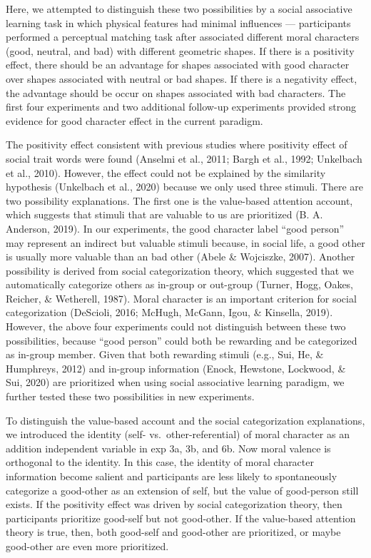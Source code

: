 \documentclass[
  man]{apa6}
\begin{document}
Here, we attempted to distinguish these two possibilities by a social associative learning task in which physical features had minimal influences --- participants performed a perceptual matching task after associated different moral characters (good, neutral, and bad) with different geometric shapes. If there is a positivity effect, there should be an advantage for shapes associated with good character over shapes associated with neutral or bad shapes. If there is a negativity effect, the advantage should be occur on shapes associated with bad characters. The first four experiments and two additional follow-up experiments provided strong evidence for good character effect in the current paradigm.

The positivity effect consistent with previous studies where positivity effect of social trait words were found (Anselmi et al., 2011; Bargh et al., 1992; Unkelbach et al., 2010). However, the effect could not be explained by the similarity hypothesis (Unkelbach et al., 2020) because we only used three stimuli. There are two possibility explanations. The first one is the value-based attention account, which suggests that stimuli that are valuable to us are prioritized (B. A. Anderson, 2019). In our experiments, the good character label ``good person'' may represent an indirect but valuable stimuli because, in social life, a good other is usually more valuable than an bad other (Abele \& Wojciszke, 2007). Another possibility is derived from social categorization theory, which suggested that we automatically categorize others as in-group or out-group (Turner, Hogg, Oakes, Reicher, \& Wetherell, 1987). Moral character is an important criterion for social categorization (DeScioli, 2016; McHugh, McGann, Igou, \& Kinsella, 2019). However, the above four experiments could not distinguish between these two possibilities, because ``good person'' could both be rewarding and be categorized as in-group member. Given that both rewarding stimuli (e.g., Sui, He, \& Humphreys, 2012) and in-group information (Enock, Hewstone, Lockwood, \& Sui, 2020) are prioritized when using social associative learning paradigm, we further tested these two possibilities in new experiments.

To distinguish the value-based account and the social categorization explanations, we introduced the identity (self- vs.~other-referential) of moral character as an addition independent variable in exp 3a, 3b, and 6b. Now moral valence is orthogonal to the identity. In this case, the identity of moral character information become salient and participants are less likely to spontaneously categorize a good-other as an extension of self, but the value of good-person still exists. If the positivity effect was driven by social categorization theory, then participants prioritize good-self but not good-other. If the value-based attention theory is true, then, both good-self and good-other are prioritized, or maybe good-other are even more prioritized.
\end{document}
